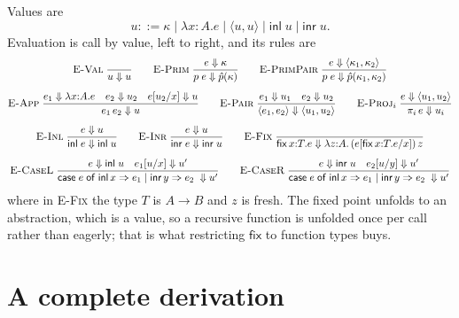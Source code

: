 \documentclass[11pt,openany]{book}
\theoremstyle{remark}
\begin{document}
Values are
\[
u ::= \kappa\mid\lambda x{:}A.e \mid \langle u,u\rangle \mid
\mathsf{inl}\;u \mid \mathsf{inr}\;u.
\]
Evaluation is call by value, left to right, and its rules are
{\small
\[
\begin{gathered}
\textsc{E-Val}\;\frac{}{u\Downarrow u}
\qquad
\textsc{E-Prim}\;\frac{e\Downarrow\kappa}{p\;e\Downarrow\hat p(\kappa)}
\qquad
\textsc{E-PrimPair}\;\frac{e\Downarrow\langle\kappa_1,\kappa_2\rangle}
{p\;e\Downarrow\hat p(\kappa_1,\kappa_2)}
\\[1.2ex]
\textsc{E-App}\;\frac{e_1\Downarrow\lambda x{:}A.e\quad e_2\Downarrow u_2\quad
e[u_2/x]\Downarrow u}{e_1\,e_2\Downarrow u}
\qquad
\textsc{E-Pair}\;\frac{e_1\Downarrow u_1\quad e_2\Downarrow u_2}
{\langle e_1,e_2\rangle\Downarrow\langle u_1,u_2\rangle}
\qquad
\textsc{E-Proj}_i\;\frac{e\Downarrow\langle u_1,u_2\rangle}{\pi_i\,e\Downarrow u_i}
\\[1.2ex]
\textsc{E-Inl}\;\frac{e\Downarrow u}{\mathsf{inl}\;e\Downarrow\mathsf{inl}\;u}
\qquad
\textsc{E-Inr}\;\frac{e\Downarrow u}{\mathsf{inr}\;e\Downarrow\mathsf{inr}\;u}
\qquad
\textsc{E-Fix}\;\frac{}{\mathsf{fix}\,x{:}T.e\Downarrow
\lambda z{:}A.\,(e[\mathsf{fix}\,x{:}T.e/x])\,z}
\\[1.2ex]
\textsc{E-CaseL}\;\frac{e\Downarrow\mathsf{inl}\;u\quad e_1[u/x]\Downarrow u'}
{\mathsf{case}\;e\;\mathsf{of}\;\mathsf{inl}\,x\Rightarrow e_1\mid
\mathsf{inr}\,y\Rightarrow e_2\;\Downarrow u'}
\qquad
\textsc{E-CaseR}\;\frac{e\Downarrow\mathsf{inr}\;u\quad e_2[u/y]\Downarrow u'}
{\mathsf{case}\;e\;\mathsf{of}\;\mathsf{inl}\,x\Rightarrow e_1\mid
\mathsf{inr}\,y\Rightarrow e_2\;\Downarrow u'}
\end{gathered}
\]
}
where in \textsc{E-Fix} the type $T$ is $A\to B$ and $z$ is fresh. The
fixed point unfolds to an abstraction, which is a value, so a recursive
function is unfolded once per call rather than eagerly; that is what
restricting $\mathsf{fix}$ to function types buys.

\section{A complete derivation}
\end{document}
